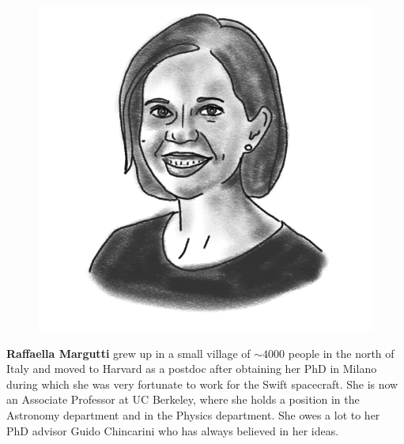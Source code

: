 \begin{figure}
\includegraphics[width=0.9\linewidth]{portraits/raf.png}
\end{figure}
\textbf{Raffaella Margutti} grew up in a small village of $\sim4000$ people in the north of Italy and moved to Harvard as a postdoc after obtaining her PhD in Milano during which she was very fortunate to work for the Swift spacecraft. She is now an Associate Professor at UC Berkeley, where she holds a position in the Astronomy department and in the Physics department. She owes a lot to her PhD advisor Guido Chincarini who has always believed in her ideas.\\
\\

